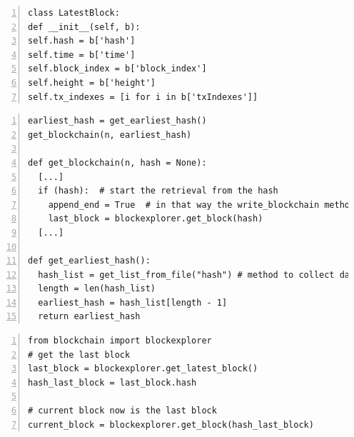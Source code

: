 \documentclass[USenglish]{uit-thesis}
\begin{document}
\begin{appendices}
\begin{lstlisting}[float, numbers=left,frame=single,caption={Structure of the latest block retrieved. The function get\_latest\_block() will return an object with this structure.}]
class LatestBlock:
def __init__(self, b):
self.hash = b['hash']
self.time = b['time']
self.block_index = b['block_index']
self.height = b['height']
self.tx_indexes = [i for i in b['txIndexes']]
\end{lstlisting}


\begin{lstlisting}[float, numbers=left, frame=single, caption={Collecting data starting from the last element in the blockchain.txt file.}]
earliest_hash = get_earliest_hash()
get_blockchain(n, earliest_hash)

def get_blockchain(n, hash = None):
  [...]
  if (hash):  # start the retrieval from the hash
    append_end = True  # in that way the write_blockchain method knows that has to append blocks and not write them at the beginning
    last_block = blockexplorer.get_block(hash)
  [...]

def get_earliest_hash():
  hash_list = get_list_from_file("hash") # method to collect data from blockchain.txt file having as attribute "hash"
  length = len(hash_list)
  earliest_hash = hash_list[length - 1]
  return earliest_hash
\end{lstlisting}


\begin{lstlisting}[float, numbers=left, frame=single,caption={Calling \url{blockchain.info} through python \gls{api} and retrieving part of the blockchain.}]
from blockchain import blockexplorer
# get the last block
last_block = blockexplorer.get_latest_block()
hash_last_block = last_block.hash

# current block now is the last block
current_block = blockexplorer.get_block(hash_last_block)
\end{lstlisting}


\end{appendices}
\end{document}
